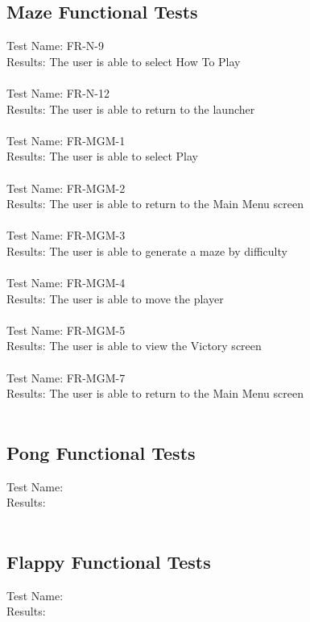 \documentclass[12pt, titlepage]{article}
\begin{document}
\subsection{Maze Functional Tests}
	Test Name: FR-N-9 \\
	Results: The user is able to select How To Play \\ \\
	Test Name: FR-N-12 \\
	Results: The user is able to return to the launcher \\ \\
	Test Name: FR-MGM-1 \\
	Results: The user is able to select Play \\ \\
	Test Name: FR-MGM-2 \\
	Results: The user is able to return to the Main Menu screen\\ \\
	Test Name: FR-MGM-3 \\
	Results: The user is able to generate a maze by difficulty \\ \\ 
	Test Name: FR-MGM-4 \\ 
	Results: The user is able to move the player \\ \\
	Test Name: FR-MGM-5 \\
	Results: The user is able to view the Victory screen \\ \\
	Test Name: FR-MGM-7 \\ 
	Results: The user is able to return to the Main Menu screen\\ \\
	
\subsection{Pong Functional Tests}
	Test Name: \\
	Results: \\ \\
	
\subsection{Flappy Functional Tests}
	Test Name: \\
	Results: \\ \\
	
\end{document}
